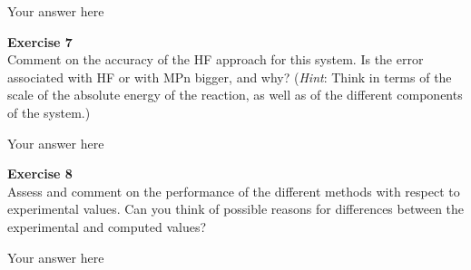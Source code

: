 \documentclass{article}
\begin{document}
Your answer here

\begin{mdframed}
\textbf{Exercise 7}\\
Comment on the accuracy of the HF approach for this system. Is the
error associated with HF or with MPn bigger, and why?
(\textit{Hint}: Think in terms of the scale of the absolute energy of the
reaction, as well as of the different components of the system.)
\end{mdframed}

Your answer here

\begin{mdframed}
\textbf{Exercise 8}\\
Assess and comment on the performance of the different methods with respect to experimental values. Can you think of possible reasons for differences between the experimental and computed values?
\end{mdframed}

Your answer here
\end{document}
